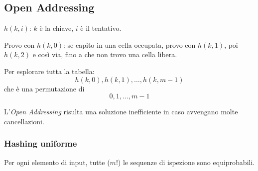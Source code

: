 \subsection{Open Addressing} \label{hash:openaddessing}

$h(k,i)$: $k$ è la chiave, $i$ è il tentativo.\par
Provo con $h(k,0)$: se capito in una cella occupata, provo con $h(k,1)$, poi $h(k,2)$
e così via, fino a che non trovo una cella libera.

Per esplorare tutta la tabella:
$$h(k,0), h(k,1), \dots, h(k,m-1)$$
che è una permutazione di 
$$0,1,\dots,m-1$$




L'\emph{Open Addressing} risulta una soluzione inefficiente in caso
avvengano molte cancellazioni.

\subsubsection{Hashing uniforme}

Per ogni elemento di input, tutte ($m!$) le sequenze di ispezione
sono equiprobabili.

